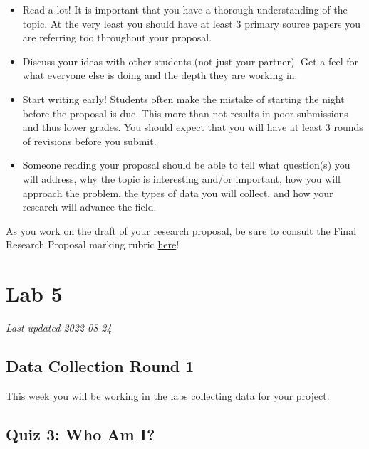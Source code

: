 \documentclass[
]{book}
\providecommand{\tightlist}{%
  \setlength{\itemsep}{0pt}\setlength{\parskip}{0pt}}
\begin{document}
\begin{itemize}
\tightlist
\item
  Read a lot! It is important that you have a thorough understanding of the topic. At the very least you should have at least 3 primary source papers you are referring too throughout your proposal.
\item
  Discuss your ideas with other students (not just your partner). Get a feel for what everyone else is doing and the depth they are working in.
\item
  Start writing early! Students often make the mistake of starting the night before the proposal is due. This more than not results in poor submissions and thus lower grades. You should expect that you will have at least 3 rounds of revisions before you submit.
\item
  Someone reading your proposal should be able to tell what question(s) you will address, why the topic is interesting and/or important, how you will approach the problem, the types of data you will collect, and how your research will advance the field.
\end{itemize}

As you work on the draft of your research proposal, be sure to consult the Final Research Proposal marking rubric \href{https://ubco-biology.github.io/BIOL-205-Lab-Manual/research-proposal-rubric.html}{here}!

\hypertarget{part-lab-5}{%
\part*{Lab 5}\label{part-lab-5}}

\emph{Last updated 2022-08-24}

\hypertarget{data-collection-round-1}{%
\chapter*{Data Collection Round 1}\label{data-collection-round-1}}

This week you will be working in the labs collecting data for your project.

\hypertarget{quiz-3-who-am-i}{%
\chapter*{Quiz 3: Who Am I?}\label{quiz-3-who-am-i}}
\end{document}
